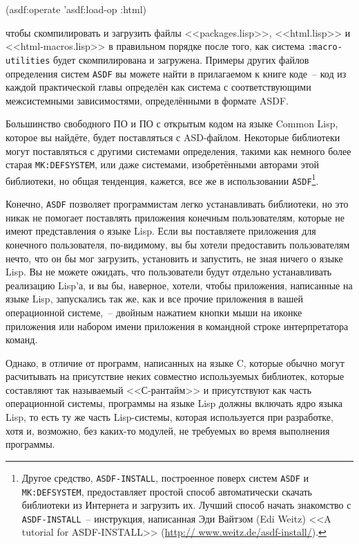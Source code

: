 \begin{myverb}
(asdf:operate 'asdf:load-op :html)
\end{myverb}

\noindent{}чтобы скомпилировать и загрузить файлы <<packages.lisp>>, <<html.lisp>> и
<<html-macros.lisp>> в правильном порядке после того, как система \lstinline{:macro-utilities}
будет скомпилирована и загружена. Примеры других файлов определения систем \lstinline{ASDF} вы
можете найти в прилагаемом к книге коде~-- код из каждой практической главы определён как
система с соответствующими межсистемными зависимостями, определёнными в формате ASDF.

Большинство свободного ПО и ПО с открытым кодом на языке Common Lisp, которое вы найдёте,
будет поставляться с ASD-файлом. Некоторые библиотеки могут поставляться с другими
системами определения, такими как немного более старая \lstinline{MK:DEFSYSTEM}, или даже
системами, изобретёнными авторами этой библиотеки, но общая тенденция, кажется, все же в
использовании \lstinline{ASDF}\footnote{Другое средство, \lstinline{ASDF-INSTALL},
  построенное поверх систем \lstinline{ASDF} и \lstinline{MK:DEFSYSTEM}, предоставляет
  простой способ автоматически скачать библиотеки из Интернета и загрузить их. Лучший
  способ начать знакомство с \lstinline{ASDF-INSTALL}~-- инструкция, написанная Эди
  Вайтзом (Edi Weitz) <<A tutorial for ASDF-INSTALL>> (\url{http://
    www.weitz.de/asdf-install/}).}\hspace{\footnotenegspace}.

Конечно, \lstinline{ASDF} позволяет программистам легко устанавливать библиотеки, но это никак
не помогает поставлять приложения конечным пользователям, которые не имеют представления о
языке Lisp. Если вы поставляете приложения для конечного пользователя, по-видимому, вы бы
хотели предоставить пользователям нечто, что он бы мог загрузить, установить и запустить,
не зная ничего о языке Lisp. Вы не можете ожидать, что пользователи будут отдельно
устанавливать реализацию Lisp'а, и вы бы, наверное, хотели, чтобы приложения, написанные на
языке Lisp, запускались так же, как и все прочие приложения в вашей операционной
системе,~-- двойным нажатием кнопки мыши на иконке приложения или набором имени приложения
в командной строке интерпретатора команд.

Однако, в отличие от программ, написанных на языке C, которые обычно могут расчитывать на
присутствие неких совместно используемых библиотек, которые составляют так называемый
<<С-рантайм>> и присутствуют как часть операционной системы, программы на языке Lisp
должны включать ядро языка Lisp, то есть ту же часть Lisp-системы, которая используется
при разработке, хотя и, возможно, без каких-то модулей, не требуемых во время выполнения
программы.

